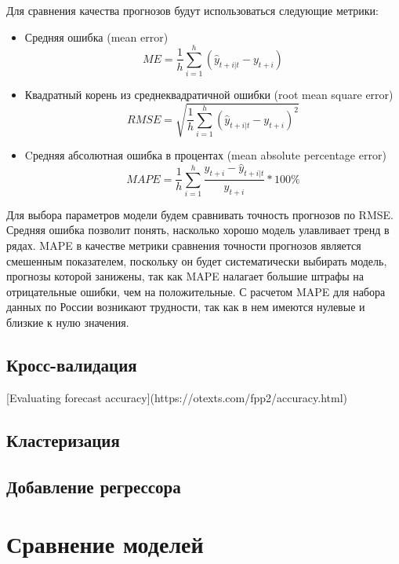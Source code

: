 \documentclass[12pt,a4paper, oneside]{extreport}
\begin{document}
Для сравнения качества прогнозов будут использоваться следующие метрики:
\begin{itemize}
	\item  Средняя ошибка (mean error)
\begin{equation}\label{key}
ME = \frac{1}{h} \sum_{i=1}^h(\hat{y}_{t+i|t}-y_{t+i}) 
\end{equation}
\item  Квадратный корень из среднеквадратичной ошибки (root mean square error)
\begin{equation}\label{key}
RMSE = \sqrt{  \frac{1}{h} \sum_{i=1}^h(\hat{y}_{t+i|t}-y_{t+i})^2} 
\end{equation}
\item  Cредняя абсолютная ошибка в процентах  (mean absolute percentage error)
\begin{equation}\label{key}
MAPE = \frac{1}{h} \sum_{i=1}^h \frac{y_{t+i} - \hat{y}_{t+i|t} }{y_{t+i}} * 100\%
\end{equation}

\end{itemize}
Для выбора параметров модели будем сравнивать точность прогнозов по RMSE. Средняя ошибка позволит понять, насколько хорошо модель улавливает тренд в рядах. MAPE в качестве метрики сравнения точности прогнозов является смешенным показателем, поскольку он будет систематически выбирать модель, прогнозы которой занижены, так как MAPE налагает большие штрафы на отрицательные ошибки, чем на положительные. 
С расчетом MAPE для набора данных по России возникают трудности, так как в нем имеются нулевые и близкие к нулю значения.

\subsection{Кросс-валидация}

[Evaluating forecast accuracy](https://otexts.com/fpp2/accuracy.html)

\subsection{Кластеризация}

\subsection{Добавление регрессора}

\section{Сравнение моделей}
\end{document}
